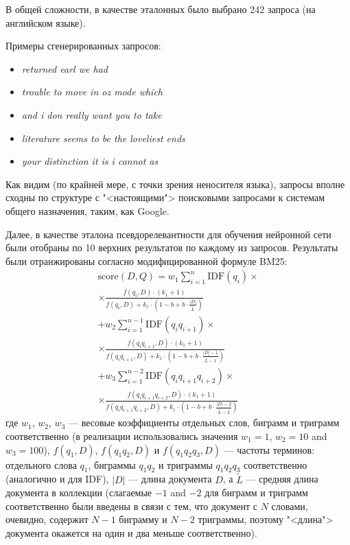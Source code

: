 В общей сложности, в качестве эталонных было выбрано 242 запроса (на английском языке).

Примеры сгенерированных запросов:
\begin{itemize}
    \item \textit{returned earl   we had }
    \item \textit{trouble to move in oz mode which}
    \item \textit{and i don really want you to take}
    \item \textit{literature seems to be the loveliest ends }
    \item \textit{your distinction  it is i cannot as}
\end{itemize}

Как видим (по крайней мере, с точки зрения неносителя языка), запросы вполне сходны по структуре с "<настоящими"> поисковыми
запросами к системам общего назначения, таким, как Google.

Далее, в качестве эталона псевдорелевантности для обучения нейронной сети были отобраны по 10 верхних результатов по каждому из
запросов. Результаты были отранжированы согласно модифицированной формуле BM25:
\begin{equation}
    \label{eq:wbm25}
    \begin{aligned}
    \text{score}(D,Q) = w_1 \sum_{i=1}^{n} \text{IDF}(q_i) \times \\ \times \frac{f(q_i, D) \cdot (k_1 + 1)}{f(q_i, D) + k_1 \cdot \left(1 - b + b \cdot \frac{|D|}{\tilde{L}}\right)} \\
    + w_2  \sum_{i=1}^{n-1} \text{IDF}(q_i q_{i+1}) \times \\ \times \frac{f(q_i q_{i+1}, D) \cdot (k_1 + 1)}{f(q_i q_{i+1}, D) + k_1 \cdot \left(1 - b + b \cdot \frac{|D| - 1}{\tilde{L} - 1}\right)} \\
    + w_3  \sum_{i=1}^{n-2} \text{IDF}(q_i q_{i+1}q_{i+2}) \times \\ \times \frac{f(q_i q_{i+1}q_{i+2}, D) \cdot (k_1 + 1)}{f(q_i q_{i+1}q_{i+2}, D) + k_1 \cdot \left(1 - b + b \cdot \frac{|D| - 2}{\tilde{L} - 2}\right)}
    \end{aligned}
\end{equation}
где \(w_1\), \(w_2\), \(w_3\) --- весовые коэффициенты отдельных слов, биграмм и триграмм соответственно (в реализации 
использовались значения \(w_1=1\), \(w_2=10\) and \(w_3=100\)), \(f(q_1, D)\), \(f(q_1q_2, D)\) и \(f(q_1q_2q_3, D)\) --- 
частоты терминов: отдельного слова \(q_1\), биграммы \(q_1q_2\) и триграммы \(q_1q_2q_3\) соответственно (аналогично и для IDF),
 \(|D|\) --- длина документа \(D\), а \(\tilde{L}\) --- средняя длина документа в коллекции (слагаемые \(-1\) and \(-2\) 
для биграмм и триграмм соответственно были введены в связи с тем, что документ с \(N\) словами, очевидно, содержит 
\(N-1\) биграмму и \(N-2\) триграммы, поэтому "<длина"> документа окажется на один и два меньше соответственно).

